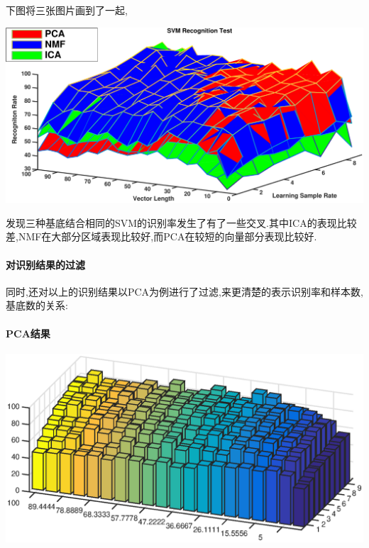 	
	下图将三张图片画到了一起,	
	\begin{center}
	\begin{minipage}[t]{\linewidth}
	\center
	{
	\includegraphics[width=\textwidth]{Img/svm_pcanmfica} 
	
	}
	\end{minipage}
	\medskip
	\end{center}
	发现三种基底结合相同的SVM的识别率发生了有了一些交叉.其中ICA的表现比较差,NMF在大部分区域表现比较好,而PCA在较短的向量部分表现比较好.
	
	\paragraph{对识别结果的过滤} 同时,还对以上的识别结果以PCA为例进行了过滤,来更清楚的表示识别率和样本数,基底数的关系:
	
	\paragraph{PCA结果}
	\begin{center}
	\begin{minipage}[t]{\linewidth}
	\center
	{
	\includegraphics[width=\MyFactor\textwidth]{Img/c4/pca} 
		\captionsetup{justification=centering}
	}
	\end{minipage}
	\medskip
	\end{center}
	
